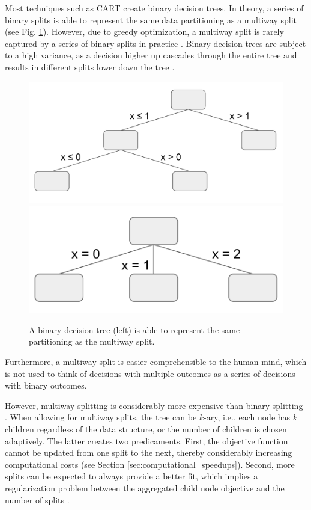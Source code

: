 \documentclass[a4paper, 11pt]{article}
\begin{document}
Most techniques such as CART create binary decision trees. In theory, a series of binary splits is able to represent the same data partitioning as a multiway split  \cite{hastie_elemstatlearn} (see Fig. \ref{fig:binary_vs_multiway}). However, due to greedy optimization, a multiway split is rarely captured by a series of binary splits in practice \cite{wang_multiway_splits}. Binary decision trees are subject to a high variance, as a decision higher up cascades through the entire tree and results in different splits lower down the tree \cite{hastie_elemstatlearn}. 
\begin{figure}
    \centering
    \includegraphics[width = 0.59\linewidth]{thesis/figure/binary_splits.png}
    \includegraphics[width = 0.4\linewidth]{thesis/figure/threeway_split.png}
    \caption{A binary decision tree (left) is able to represent the same partitioning as the multiway split.}
    \label{fig:binary_vs_multiway}
\end{figure}
Furthermore, a multiway split is easier comprehensible to the human mind, which is not used to think of decisions with multiple outcomes as a series of decisions with binary outcomes.
\par
However, multiway splitting is considerably more expensive than binary splitting \cite{wang_multiway_splits}.
When allowing for multiway splits, the tree can be $k$-ary, i.e., each node has $k$ children regardless of the data structure, or the number of children is chosen adaptively. The latter creates two predicaments. First, the objective function cannot be updated from one split to the next, thereby considerably increasing computational costs (see Section \ref{sec:computational_speedups}). Second, more splits can be expected to always provide a better fit, which implies a regularization problem between the aggregated child node objective and the number of splits \cite{wang_multiway_splits}.
\end{document}
